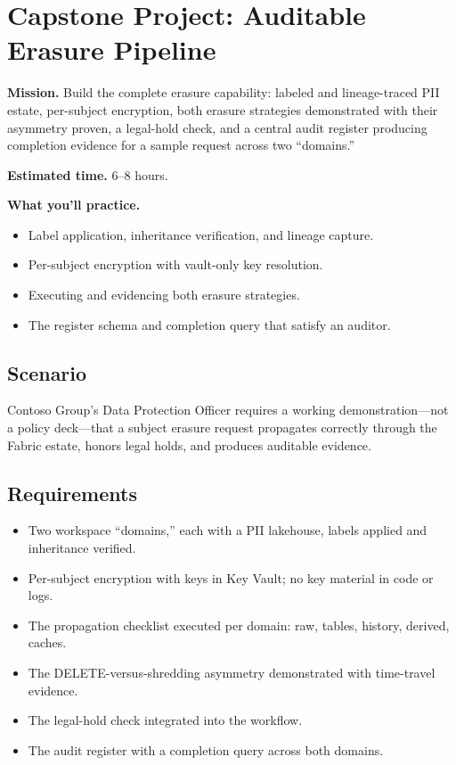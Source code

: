 \section{Capstone Project: Auditable Erasure Pipeline}\label{sec:ch22-capstone}

\begin{capstonebox}
\textbf{Mission.} Build the complete erasure capability: labeled and lineage-traced PII estate, per-subject encryption, both erasure strategies demonstrated with their asymmetry proven, a legal-hold check, and a central audit register producing completion evidence for a sample request across two ``domains.''

\textbf{Estimated time.} 6--8 hours.

\textbf{What you'll practice.}
\begin{itemize}
    \item Label application, inheritance verification, and lineage capture.
    \item Per-subject encryption with vault-only key resolution.
    \item Executing and evidencing both erasure strategies.
    \item The register schema and completion query that satisfy an auditor.
\end{itemize}
\end{capstonebox}

\subsection*{Scenario}
Contoso Group's Data Protection Officer requires a working demonstration---not a policy deck---that a subject erasure request propagates correctly through the Fabric estate, honors legal holds, and produces auditable evidence.

\subsection*{Requirements}
\begin{itemize}
    \item Two workspace ``domains,'' each with a PII lakehouse, labels applied and inheritance verified.
    \item Per-subject encryption with keys in Key Vault; no key material in code or logs.
    \item The propagation checklist executed per domain: raw, tables, history, derived, caches.
    \item The DELETE-versus-shredding asymmetry demonstrated with time-travel evidence.
    \item The legal-hold check integrated into the workflow.
    \item The audit register with a completion query across both domains.
\end{itemize}

